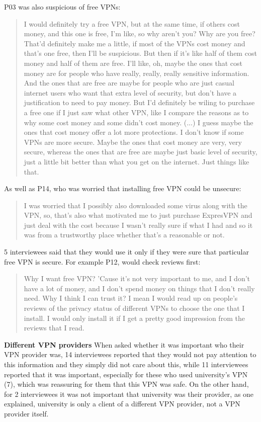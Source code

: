 P03 was also suspicious of free VPNs:
\begin{quote}I would definitely try a free VPN, but at the same time, if others cost money, and this one is free, I'm like, so why aren't you? Why are you free? That'd definitely make me a little, if most of the VPNs cost money and that's one free, then I'll be suspicious. But then if it's like half of them cost money and half of them are free. I'll like, oh, maybe the ones that cost money are for people who have really, really, really sensitive information. And the ones that are free are maybe for people who are just casual internet users who want that extra level of security, but don't have a justification to need to pay money. But I'd definitely be wiling to purchase a free one if I just saw what other VPN, like I compare the reasons as to why some cost money and some didn't cost money. (...) I guess maybe the ones that cost money offer a lot more protections. I don't know if some VPNs are more secure. Maybe the ones that cost money are very, very secure, whereas the ones that are free are maybe just basic level of security, just a little bit better than what you get on the internet. Just things like that.\end{quote}

As well as P14, who was worried that installing free VPN could be unsecure:
\begin{quote}I was worried that I possibly also downloaded some virus along with the VPN, so, that's also what motivated me to just purchase ExpresVPN and just deal with the cost because I wasn't really sure if what I had and so it was from a trustworthy place whether that's a reasonable or not.\end{quote}

5 interviewees said that they would use it only if they were sure that particular free VPN is secure. For example P12, would check reviews first:
\begin{quote}Why I want free VPN? 'Cause it's not very important to me, and I don't have a lot of money, and I don't spend money on things that I don't really need. Why I think I can trust it? I mean I would read up on people's reviews of the privacy status of different VPNs to choose the one that I install. I would only install it if I get a pretty good impression from the reviews that I read.\end{quote}

\textbf{Different VPN providers} When asked whether it was important who their VPN provider was, 14 interviewees reported that they would not pay attention to this information and they simply did not care about this, while 11 interviewees reported that it was important, especially for these who used university’s VPN (7), which was reassuring for them that this VPN was safe. On the other hand, for 2 interviewees it was not important that university was their provider, as one explained, university is only a client of a different VPN provider, not a VPN provider itself. 


